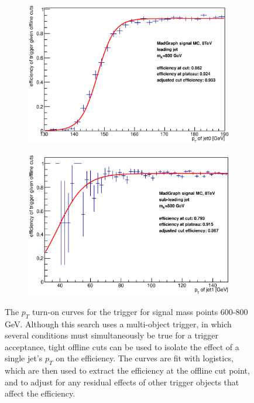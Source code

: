 \begin{figure}[phtb!]
\begin{center}
  \begin{subfigure}[leading jet, $m_{A}=800$ GeV]{0.4\textwidth}\includegraphics[width=\textwidth]{Systematics/images/jet0_trigger_turn_on_bAbb_800_j35.eps}\end{subfigure}
  \begin{subfigure}[sub-leading jet, $m_{A}=800$ GeV]{0.4\textwidth}\includegraphics[width=\textwidth]{Systematics/images/jet1_trigger_turn_on_bAbb_800_j35.eps}\end{subfigure}
  \caption{The $p_T$ turn-on curves for the trigger for signal mass points 600-800 GeV.
  Although this search uses a multi-object trigger, in which several conditions 
  must simultaneously be true for a trigger acceptance, tight offline cuts can be used to isolate the effect 
  of a single jet's $p_T$ on the efficiency.  The curves are fit 
  with logistics, which are then used to extract the efficiency at the offline cut point, and to 
  adjust for any residual effects of other trigger objects that affect the efficiency. \label{fig:trigger_turn_on_1}}
    \end{center}
\end{figure}



